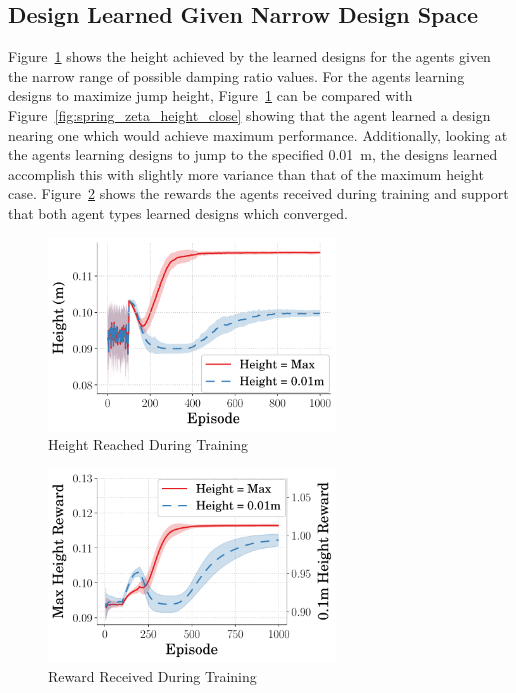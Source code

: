 \documentclass[letterpaper, 10 pt, conference]{ieeeconf}  %
\begin{document}
\subsection{Design Learned Given Narrow Design Space}

Figure~\ref{fig:height_vs_step_close} shows the height achieved by the learned designs for the agents given the narrow range of possible damping ratio values. For the agents learning designs to maximize jump height, Figure~\ref{fig:height_vs_step_close} can be compared with Figure~\ref{fig:spring_zeta_height_close} showing that the agent learned a design nearing one which would achieve maximum performance. Additionally, looking at the agents learning designs to jump to the specified 0.01~m, the designs learned accomplish this with slightly more variance than that of the maximum height case. Figure~\ref{fig:rew_vs_step_close} shows the rewards the agents received during training and support that both agent types learned designs which converged. 
%
\begin{figure}[tb]
        \begin{center}
        \includegraphics[width = 3in]{figures/narrow_design_space/HeightVsTime_2021-10-12_144818.pdf}  
        \caption{Height Reached During Training}
        \label{fig:height_vs_step_close}
        \end{center}
        \end{figure}
%
\begin{figure}[tb]
        \begin{center}
        \includegraphics[width = 3in]{figures/narrow_design_space/RewVsTime_2021-10-12_144814.pdf}  
        \caption{Reward Received During Training}
        \label{fig:rew_vs_step_close}
        \end{center}
        \end{figure}
%
\end{document}
